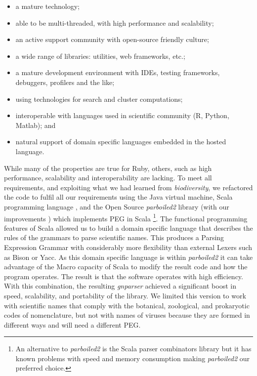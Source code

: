 \documentclass{bmcart}
\begin{document}
\begin{itemize}

    \item a mature technology;

    \item able to be multi-threaded, with high performance and scalability;

    \item an active support community with open-source friendly culture;

    \item a wide range of libraries: utilities, web frameworks, etc.;

    \item a mature development environment with IDEs, testing frameworks, debuggers,  profilers and the like;

    \item using technologies for search and cluster computations;

    \item interoperable with languages used in scientific community (R,
      Python, Matlab); and

    \item natural support of domain specific languages embedded in the hosted
      language.

\end{itemize}

While many of the properties are true for Ruby, others, such as high
performance, scalability and interoperability are lacking. To meet all
requirements, and exploiting what we had learned from \textit{biodiversity}, we
refactored the code to fulfil all our requirements using the Java virtual machine, Scala
programming language \cite{odersky2004overview}, and the Open Source
\textit{parboiled2} library \cite{parboiled2, myltsev-parboiled2} (with our improvements \cite{parboiled2-gna}) which implements PEG in Scala \footnote{An
alternative to \textit{parboiled2} is the Scala parser combinators library
\cite{moors2008parser} but it has known problems with speed and memory consumption
making \textit{parboiled2} our preferred choice.}. The functional programming features of Scala allowed us to build a 
domain specific language that describes the rules of the grammars to parse scientific names.
This produces a Parsing Expression Grammar with considerably more
flexibility than external Lexers such as Bison or Yacc. As this domain specific
language is within \textit{parboiled2} it can take advantage of the Macro
capacity of Scala \cite{Burmako:2013:SML:2489837.2489840} to modify the result code and 
how the program operates. The result is that the software operates
with high efficiency. With this combination, the resulting \textit{gnparser} achieved a significant
boost in speed, scalability, and portability of the library.  We limited this
version to work with scientific names that comply with the botanical,
zoological, and prokaryotic codes of nomenclature, but not with names of viruses because they are
formed in different ways \cite{ICTV, Patterson:inpress-a} and will need a different PEG.
\end{document}
